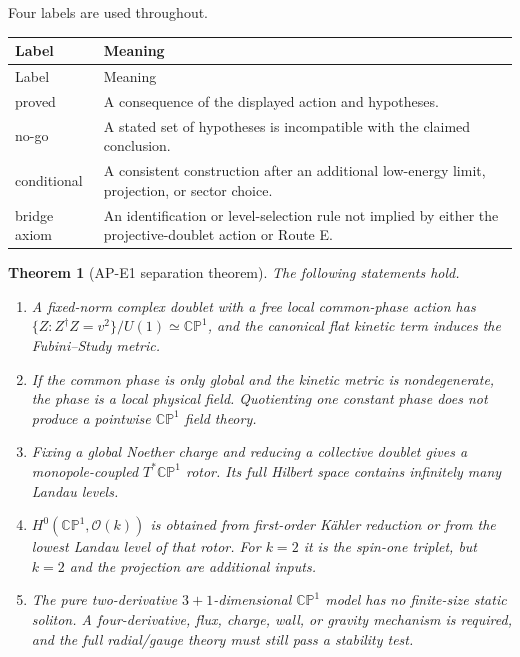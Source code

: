 \documentclass[11pt]{article}
\numberwithin{equation}{section}
\newcommand{\CP}{\mathbb{CP}}
\newcommand{\cO}{\mathcal O}
\newcommand{\status}[1]{\textsf{#1}}
\newtheorem{theorem}{Theorem}[section]
\begin{document}
Four labels are used throughout.
\begin{longtable}{>{\raggedright\arraybackslash}p{}
                  >{\raggedright\arraybackslash}p{}}
\toprule
Label & Meaning \\
\midrule
\endfirsthead
\toprule
Label & Meaning \\
\midrule
\endhead
\status{proved} & A consequence of the displayed action and hypotheses.\\
\status{no-go} & A stated set of hypotheses is incompatible with the claimed
conclusion.\\
\status{conditional} & A consistent construction after an additional
low-energy limit, projection, or sector choice.\\
\status{bridge axiom} & An identification or level-selection rule not implied
by either the projective-doublet action or Route E.\\
\bottomrule
\end{longtable}

\begin{theorem}[AP-E1 separation theorem]
The following statements hold.
\begin{enumerate}
\item A fixed-norm complex doublet with a free local common-phase action has
\(
 \{Z:Z^\dagger Z=v^2\}/U(1)\simeq\CP^1
\), and the canonical flat kinetic term induces the Fubini--Study metric.
\item If the common phase is only global and the kinetic metric is
nondegenerate, the phase is a local physical field.  Quotienting one constant
phase does not produce a pointwise \(\CP^1\) field theory.
\item Fixing a global Noether charge and reducing a collective doublet gives a
monopole-coupled \(T^*\CP^1\) rotor.  Its full Hilbert space contains infinitely
many Landau levels.
\item \(H^0(\CP^1,\cO(k))\) is obtained from first-order K\"ahler reduction or
from the lowest Landau level of that rotor.  For \(k=2\) it is the spin-one
triplet, but \(k=2\) and the projection are additional inputs.
\item The pure two-derivative \(3+1\)-dimensional \(\CP^1\) model has no
finite-size static soliton.  A four-derivative, flux, charge, wall, or gravity
mechanism is required, and the full radial/gauge theory must still pass a
stability test.
\end{enumerate}
\end{theorem}
\end{document}
